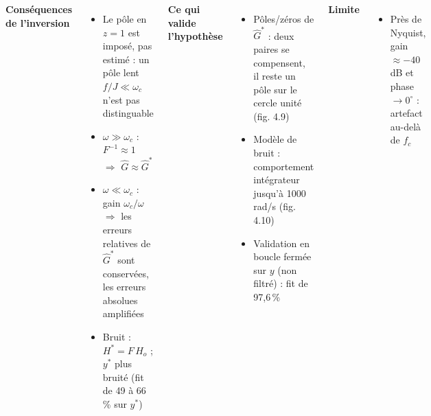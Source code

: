 \begin{frame}

    \begin{columns}[t]
        \textbf{Conséquences de l'inversion}
        \begin{itemize}
            \item Le pôle en $z = 1$ est \alert{imposé}, pas estimé : un pôle lent $f/J \ll \omega_c$ n'est pas distinguable
            \item $\omega \gg \omega_c$ : $F^{-1} \approx 1$ $\Rightarrow$ $\hat{G} \approx \hat{G}^*$
            \item $\omega \ll \omega_c$ : gain $\omega_c/\omega$ $\Rightarrow$ les erreurs relatives de $\hat{G}^*$ sont conservées, les erreurs absolues amplifiées
            \item Bruit : $H^* = F\,H_o$ ; $y^*$ plus bruité (fit de 49 à 66\,\% sur $y^*$)
        \end{itemize}

        \textbf{Ce qui valide l'hypothèse}
        \begin{itemize}
            \item Pôles/zéros de $\hat{G}^*$ : deux paires \alert{se compensent}, il reste un pôle sur le cercle unité (fig. 4.9)
            \item Modèle de bruit : comportement intégrateur jusqu'à 1000\,rad/s (fig. 4.10)
            \item Validation en boucle fermée sur $y$ (non filtré) : fit de \alert{97,6\,\%}
        \end{itemize}
        \textbf{Limite}
        \begin{itemize}
            \item Près de Nyquist, gain $\approx -40$\,dB et phase $\to 0^\circ$ : artefact au-delà de $f_c$
        \end{itemize}
    \end{columns}
\end{frame}

